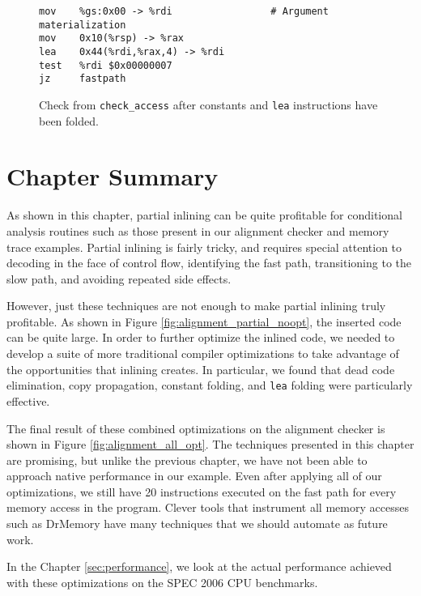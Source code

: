\begin{figure}
\begin{verbatim}
mov    %gs:0x00 -> %rdi                 # Argument materialization
mov    0x10(%rsp) -> %rax
lea    0x44(%rdi,%rax,4) -> %rdi
test   %rdi $0x00000007
jz     fastpath
\end{verbatim}
\caption{Check from {\tt check\_access} after constants and {\tt lea}
instructions have been folded.}
\label{fig:fold_immediate}
\end{figure}

\section{Chapter Summary}

As shown in this chapter, partial inlining can be quite profitable for
conditional analysis routines such as those present in our alignment checker and
memory trace examples.  Partial inlining is fairly tricky, and requires special
attention to decoding in the face of control flow, identifying the fast path,
transitioning to the slow path, and avoiding repeated side effects.

However, just these techniques are not enough to make partial inlining truly
profitable.  As shown in Figure \ref{fig:alignment_partial_noopt}, the inserted
code can be quite large.  In order to further optimize the inlined code, we
needed to develop a suite of more traditional compiler optimizations to take
advantage of the opportunities that inlining creates.  In particular, we found
that dead code elimination, copy propagation, constant folding, and {\tt lea}
folding were particularly effective.

The final result of these combined optimizations on the alignment checker is
shown in Figure \ref{fig:alignment_all_opt}.  The techniques presented in this
chapter are promising, but unlike the previous chapter, we have not been able to
approach native performance in our example.  Even after applying all of our
optimizations, we still have 20 instructions executed on the fast path for every
memory access in the program.  Clever tools that instrument all memory accesses
such as DrMemory have many techniques that we should automate as future work.

In the Chapter \ref{sec:performance}, we look at the actual performance achieved
with these optimizations on the SPEC 2006 CPU benchmarks.

